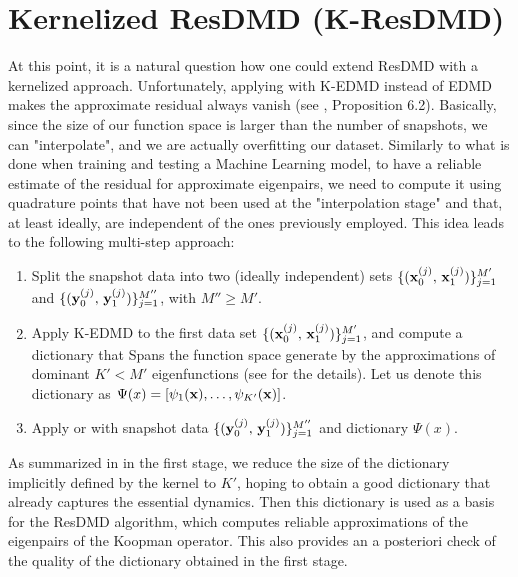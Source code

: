 \section{Kernelized ResDMD (K-ResDMD)}
At this point, it is a natural question how one could extend ResDMD with a kernelized approach. Unfortunately, applying  with K-EDMD instead of EDMD makes the approximate residual always vanish (see \cite{colbrook_rigorous_2021}, Proposition 6.2). Basically, since the size of our function space is larger than the number of snapshots, we can "interpolate", and we are actually overfitting our dataset. Similarly to what is done when training and testing a Machine Learning model, to have a reliable estimate of the residual for approximate eigenpairs, we need to compute it using quadrature points that have not been used at the "interpolation stage" and that, at least ideally, are independent of the ones previously employed. This idea leads to the following multi-step approach:
\begin{enumerate}
    \item Split the snapshot data into two (ideally independent) sets $\{(\vb{x}_0^{(j)},\,\vb{x}_1^{(j)})\}_{j=1}^{M'}$ and  $\{(\vb{y}_0^{(j)},\,\vb{y}_1^{(j)})\}_{j=1}^{M''}$, with $M'' \geq M'$.
    \item Apply K-EDMD to the first data set $\{(\vb{x}_0^{(j)},\,\vb{x}_1^{(j)})\}_{j=1}^{M'}$, and compute a dictionary that Spans the function space generate by the approximations of dominant $K' < M'$ eigenfunctions (see  for the details). Let us denote this dictionary as $\Psi(x) = \left[\psi_1(\vb{x}), \dots, \psi_{K'}(\vb{x})\right]$.
    \item Apply  or  with snapshot data $\{(\vb{y}_0^{(j)},\,\vb{y}_1^{(j)})\}_{j=1}^{M''}$ and dictionary $\Psi(x)$.
\end{enumerate}
As summarized in  in the first stage, we reduce the size of the dictionary implicitly defined by the kernel to $K'$, hoping to obtain a good dictionary that already captures the essential dynamics. Then this dictionary is used as a basis for the ResDMD algorithm, which computes reliable approximations of the eigenpairs of the Koopman operator. This also provides an a posteriori check of the quality of the dictionary obtained in the first stage.

